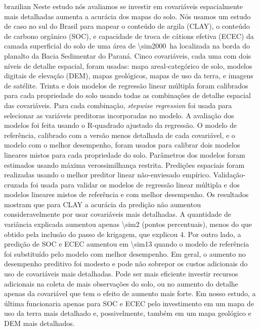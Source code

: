\begin{chapterabstract}{brazilian}{\portuguesekeys}
Neste estudo nós avaliamos se investir em covariáveis espacialmente mais detalhadas aumenta a acurácia dos 
mapas do solo. Nós usamos um estudo de caso no sul do Brasil para mapear o conteúdo de argila (CLAY), o 
conteúdo de carbono orgânico (SOC), e capacidade de troca de cátions efetiva (ECEC) da camada superficial do 
solo de uma área de \SI{\sim2000}{\hectare} localizada na borda do planalto da Bacia Sedimentar do Paraná. 
Cinco covariáveis, cada uma com dois níveis de detalhe espacial, foram usadas: mapa areal-categórico de solo,
modelos digitais de elevação (DEM), mapas geológicos, mapas de uso da terra, e imagens de satélite. Trinta e 
dois modelos de regressão linear múltipla foram calibrados para cada propriedade do solo usando todas as 
combinações de detalhe espacial das covariáveis. Para cada combinação, \textit{stepwise regression} foi 
usada para selecionar as variáveis preditoras incorporadas no modelo. A avaliação dos modelos foi feita 
usando o R-quadrado ajustado da regressão. O modelo de referência, calibrado com a versão menos detalhada de 
cada covariável, e o modelo com o melhor desempenho, foram usados para calibrar dois modelos lineares mistos 
para cada propriedade do solo. Parâmetros dos modelos foram estimados usando máxima verossimilhança 
restrita. Predições espaciais foram realizadas usando o melhor preditor linear não-enviesado empírico. 
Validação-cruzada foi usada para validar os modelos de regressão linear múltipla e dos modelos lineares 
mistos de referência e com melhor desempenho. Os resultados mostram que para CLAY a acurácia da predição não 
aumentou consideravelmente por usar covariáveis mais detalhadas. A quantidade de variância explicada 
aumentou apenas \SI{\sim2}{\pp} (pontos percentuais), menos do que obtido pela inclusão do passo de 
krigagem, que explicou \SI{4}{\pp}. Por outro lado, a predição de SOC e ECEC aumentou em \SI{\sim13}{\pp} 
quando o modelo de referência foi substituído pelo modelo com melhor desempenho. Em geral, o aumento no 
desempenho preditivo foi modesto e pode não sobrepor os custos adicionais do uso de covariáveis mais 
detalhadas. Pode ser mais eficiente investir recursos adicionais na coleta de mais observações do solo, ou 
no aumento do detalhe apenas da covariável que tem o efeito de aumento mais forte. Em nosso estudo, a última 
funcionaria apenas para SOC e ECEC pelo investimento em um mapa de uso da terra mais detalhado e, 
possivelmente, também em um mapa geológico e DEM mais detalhados.
\end{chapterabstract}

